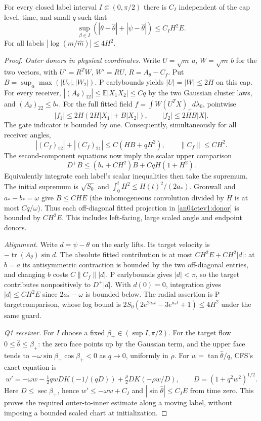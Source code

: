 \documentclass[11pt]{article}
\begin{document}
\begin{theorem}\label{an04ctev1:early}
For every closed label interval $I\Subset(0,\pi/2)$ there is $C_I$
independent of the cap level, time, and small $q$ such that
\[
 \sup_{\beta\in I}(|\theta-\widehat\theta|+
 |\psi-\widehat\theta|)\le C_I H^2 E .
\]
For all labels $|\log(m/\widehat m)|\le 4H^2$.
\end{theorem}
\begin{proof}
\emph{Outer donors in physical coordinates.}
Write $U=\sqrt m\,a$, $W=\sqrt m\,b$ for the two vectors, with
$U'=R^TW$, $W'=RU$, $R=A_\theta-C_f$. Put
$B=\sup_\alpha\max(|U_2|,|W_2|)$. P earlybounds yields
$|U|=|W|\le 2H$ on this cap. For every receiver,
$|(A_\theta)_{12}|\le \mathbb E|X_1X_2|\le Cq$ by the two Gaussian
cluster laws, and $(A_\theta)_{22}\le b_*$. For the full fitted field
$f=\int W(U^TX)_+d\lambda_0$, pointwise
\[
 |f_1|\le 2H(2H|X_1|+B|X_2|),\qquad
 |f_2|\le 2HB|X|.
\]
The gate indicator is bounded by one. Consequently, simultaneously
for all receiver angles,
\begin{equation}\label{an04ctev1:donor}
 |(C_f)_{12}|+|(C_f)_{21}|\le C(HB+qH^2),\qquad
 \|C_f\|\le C H^2 .
\end{equation}
The second-component equations now imply the scalar upper comparison
\[
 D^+B\le(b_*+CH^2)B+CqH(1+H^2).
\]
Equivalently integrate each label's scalar inequalities then take
the supremum. The initial supremum is $\sqrt{S_0}$ and
$\int_0^t H^2\le H(t)^2/(2a_*)$. Gronwall and $a_*-b_*=\omega$
give $B\le C H E$ (the inhomogeneous convolution divided by $H$
is at most $Cq/\omega$). Thus each off-diagonal fitted projection
in \eqref{an04ctev1:donor} is bounded by $C H^2 E$.
This includes left-facing, large scaled angle and endpoint donors.

\emph{Alignment.} Write $d=\psi-\theta$ on the early lifts.
Its target velocity is $-\operatorname{tr}(A_\theta)\sin d$.
The absolute fitted contribution is at most
$C H^2 E+C H^2|d|$: at $b=a$ its antisymmetric contraction
is bounded by the two off-diagonal entries, and changing $b$ costs
$C\|C_f\||d|$. P earlybounds gives $|d|<\pi$, so the target
contributes nonpositively to $D^+|d|$. With $d(0)=0$, integration
gives $|d|\le C H^2 E$ since $2a_*-\omega$ is bounded below.
The radial assertion is P targetcomparison, whose log bound is
$2S_0(2e^{2a_*t}-3e^{a_*t}+1)\le4H^2$ under the same guard.

\emph{Q1 receiver.} For $I$ choose a fixed $\beta_+\in(\sup I,\pi/2)$.
For the target flow $0\le\widehat\theta\le\beta_+$: the zero face
points up by the Gaussian term, and the upper face tends to
$-\omega\sin\beta_+\cos\beta_+<0$ as $q\to0$, uniformly in $\rho$.
For $w=\tan\widehat\theta/q$, CFS's exact equation is
\[
 w'=-\omega w-\tfrac12qwD K(-1/(qD))
          +\tfrac\rho2 D K(-\rho w/D),\qquad D=(1+q^2w^2)^{1/2}.
\]
Here $D\le\sec\beta_+$, hence $w'\le-\omega w+C_I$ and
$|\sin\widehat\theta|\le C_I E$ from time zero.
This proves the required outer-to-inner estimate along a moving label,
without imposing a bounded scaled chart at initialization.


\end{proof}
\end{document}
